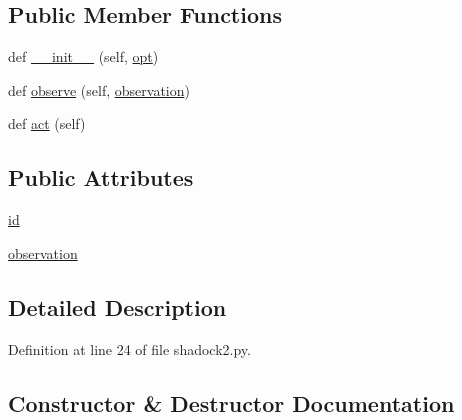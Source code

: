 \subsection*{Public Member Functions}
\begin{DoxyCompactItemize}
\item 
def \hyperlink{classshadock2_1_1RepeatLabelAgent_aaa95fcf81f5251f93425819c3683fe64}{\+\_\+\+\_\+init\+\_\+\+\_\+} (self, \hyperlink{classparlai_1_1core_1_1agents_1_1Agent_ab3b45d2754244608c75d4068b90cd051}{opt})
\item 
def \hyperlink{classshadock2_1_1RepeatLabelAgent_ade5633ad82b7dc87c7bb51bacb2591e5}{observe} (self, \hyperlink{classshadock2_1_1RepeatLabelAgent_af88efda5c17ebe03c85cc4b3446c1072}{observation})
\item 
def \hyperlink{classshadock2_1_1RepeatLabelAgent_a92d93b9cce5feb83096369a7d567624c}{act} (self)
\end{DoxyCompactItemize}
\subsection*{Public Attributes}
\begin{DoxyCompactItemize}
\item 
\hyperlink{classshadock2_1_1RepeatLabelAgent_a2f86c98e40c0ed00dce454230f6ea1b7}{id}
\item 
\hyperlink{classshadock2_1_1RepeatLabelAgent_af88efda5c17ebe03c85cc4b3446c1072}{observation}
\end{DoxyCompactItemize}


\subsection{Detailed Description}


Definition at line 24 of file shadock2.\+py.



\subsection{Constructor \& Destructor Documentation}
\mbox{\label{classshadock2_1_1RepeatLabelAgent_aaa95fcf81f5251f93425819c3683fe64}} 
